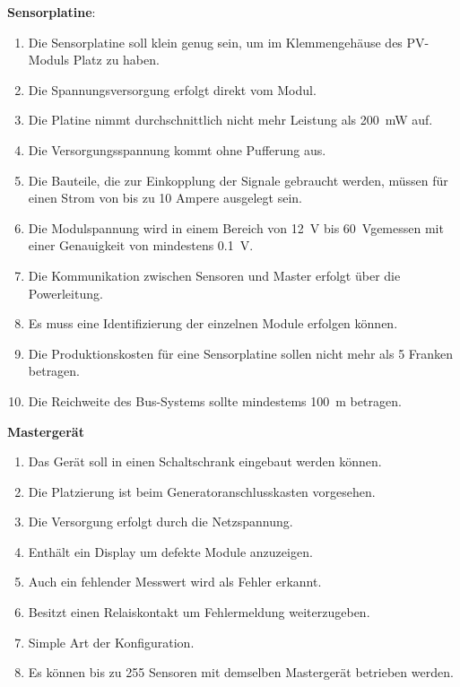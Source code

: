 \textbf{Sensorplatine}:
\begin{enumerate}
    \item
        Die Sensorplatine  soll klein  genug sein, um im  Klemmengeh\"ause des
        PV-Moduls Platz zu haben.
    \item
        Die Spannungsversorgung erfolgt direkt vom Modul.
    \item
        Die   Platine  nimmt   durchschnittlich   nicht   mehr  Leistung   als
        \SI{200}{\milli\watt} auf.
    \item
        Die Versorgungsspannung kommt ohne Pufferung aus.
    \item
        Die  Bauteile,  die  zur  Einkopplung der  Signale  gebraucht  werden,
        m\"ussen f\"ur einen Strom von bis zu 10 Ampere ausgelegt sein.
    \item
        Die   Modulspannung  wird   in   einem   Bereich  von   \SI{12}{\volt}
        bis  \SI{60}{\volt}gemessen  mit   einer  Genauigkeit  von  mindestens
        \SI{0.1}{\volt}.
    \item
        Die  Kommunikation zwischen  Sensoren  und Master  erfolgt \"uber  die
        Powerleitung.
    \item
        Es muss eine Identifizierung der einzelnen Module erfolgen k\"onnen.
    \item
        Die Produktionskosten f\"ur eine Sensorplatine sollen nicht mehr als 5
        Franken betragen.
    \item
        Die  Reichweite  des  Bus-Systems sollte  mindestems  \SI{100}{\meter}
        betragen.
\end{enumerate}

\textbf{Masterger\"at}
\begin{enumerate}
    \item
        Das Ger\"at soll in einen Schaltschrank eingebaut werden k\"onnen.
    \item
        Die Platzierung ist beim Generatoranschlusskasten vorgesehen.
    \item
        Die Versorgung erfolgt durch die Netzspannung.
    \item
        Enth\"alt ein Display um defekte Module anzuzeigen.
    \item
        Auch ein fehlender Messwert wird als Fehler erkannt.
    \item
        Besitzt einen Relaiskontakt um Fehlermeldung weiterzugeben.
    \item
        Simple Art der Konfiguration.
    \item
        Es k\"onnen bis zu 255  Sensoren mit demselben Masterger\"at betrieben
        werden.
\end{enumerate}

